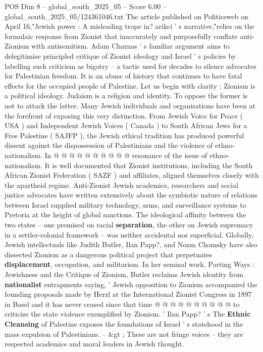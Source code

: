 \begin{textsample}{POS Dim 8 – global\_south\_2025\_05 – Score 6.00 – global\_south\_2025\_05/124361046.txt}  \label{ex:f8_pos_131}
The article published on Politicsweb on April 16,"Jewish power : A misleading trope in? arikci ' s narrative,"relies on the formulaic response from Zionist that inaccurately and purposefully conflate anti-Zionism with antisemitism.
Adam Charnas ' s familiar argument aims to delegitimise principled critique of Zionist ideology and Israel ' s policies by labelling such criticism as bigotry -- a tactic used for decades to silence advocates for Palestinian freedom.
It is an abuse of history that continues to have fatal effects for the occupied people of Palestine.
Let us begin with clarity : Zionism is a political ideology.
Judaism is a religion and identity.
To oppose the former is not to attack the latter.
Many Jewish individuals and organisations have been at the forefront of exposing this very distinction.
From Jewish Voice for Peace ( USA ) and Independent Jewish Voices ( Canada ) to South African Jews for a Free Palestine ( SAJFP ), the Jewish ethical tradition has produced powerful dissent against the dispossession of Palestinians and the violence of ethno-nationalism.
In @ @ @ @ @ @ @ @ @ @ resonance of the issue of ethno-nationalism.
It is well documented that Zionist institutions, including the South African Zionist Federation ( SAZF ) and affiliates, aligned themselves closely with the apartheid regime.
Anti-Zionist Jewish academics, researchers and social justice advocates have written extensively about the symbiotic nature of relations between Israel supplied military technology, arms, and surveillance systems to Pretoria at the height of global sanctions.
The ideological affinity between the two states -- one premised on racial \textbf{separation}, the other on Jewish supremacy in a settler-colonial framework -- was neither accidental nor superficial.
Globally, Jewish intellectuals like Judith Butler, Ilan Papp?, and Noam Chomsky have also dissected Zionism as a dangerous political project that perpetuates \textbf{displacement}, occupation, and militarism.
In her seminal work, Parting Ways : Jewishness and the Critique of Zionism, Butler reclaims Jewish identity from \textbf{nationalist} entrapments saying, ' Jewish opposition to Zionism accompanied the founding proposals made by Herzl at the International Zionist Congress in 1897 in Basel and it has never ceased since that time @ @ @ @ @ @ @ @ @ @ to criticize the state violence exemplified by Zionism. ' Ilan Papp? ' s The \textbf{Ethnic} \textbf{Cleansing} of Palestine exposes the foundations of Israel ' s statehood in the mass expulsion of Palestinians. -- \&gt ; These are not fringe voices -- they are respected academics and moral leaders in Jewish thought.

\end{textsample}
